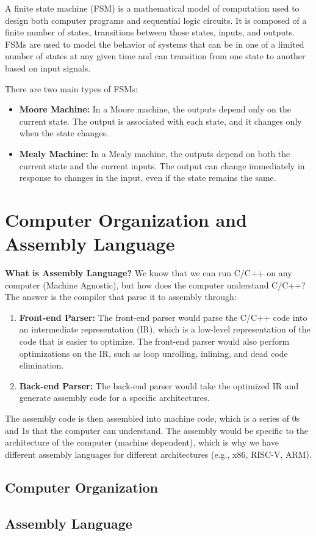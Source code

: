 \documentclass[11pt]{report}
\begin{document}
\begin{definition}
    A finite state machine (FSM) is a mathematical model of computation used to design both computer programs and sequential logic circuits. It is composed of a finite number of states, transitions between those states, inputs, and outputs. FSMs are used to model the behavior of systems that can be in one of a limited number of states at any given time and can transition from one state to another based on input signals.

    There are two main types of FSMs:
    \begin{itemize}
        \item \textbf{Moore Machine:} In a Moore machine, the outputs depend only on the current state. The output is associated with each state, and it changes only when the state changes.
        \item \textbf{Mealy Machine:} In a Mealy machine, the outputs depend on both the current state and the current inputs. The output can change immediately in response to changes in the input, even if the state remains the same.
    \end{itemize}
\end{definition}
\chapter{Computer Organization and Assembly Language}
\begin{shaded}
\textbf{What is Assembly Language?} We know that we can run C/C++ on any computer (Machine Agnostic), but how does the computer understand C/C++? The answer is the compiler that parse it to assembly through:

\begin{enumerate}
    \item \textbf{Front-end Parser:} The front-end parser would parse the C/C++ code into an intermediate representation (IR), which is a low-level representation of the code that is easier to optimize. The front-end parser would also perform optimizations on the IR, such as loop unrolling, inlining, and dead code elimination.
    \item \textbf{Back-end Parser:} The back-end parser would take the optimized IR and generate assembly code for a specific architectures.
\end{enumerate}
\end{shaded}
The assembly code is then assembled into machine code, which is a series of 0s and 1s that the computer can understand. The assembly would be specific to the architecture of the computer (machine dependent), which is why we have different assembly languages for different architectures (e.g., x86, RISC-V, ARM).
\section{Computer Organization}
\section{Assembly Language}
\end{document}
